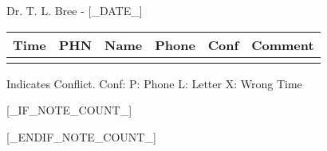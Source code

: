 \documentclass[12pt]{article}
\newenvironment{my_enumerate}{
\begin{enumerate}
  \setlength{\itemsep}{1pt}
  \setlength{\parskip}{0pt}
  \setlength{\parsep}{0pt}}{\end{enumerate}
}
\begin{document}
\begin{center}
{\Large Dr. T. L. Bree - [_DATE_]} \\[.5pc]
\end{center}


\footnotesize
\vspace{0.12in}

\begin{center}
\begin{tabular}{rllrll}
\textbf{Time} & \textbf{PHN} & \textbf{Name} & \textbf{Phone} & \textbf{Conf} & \textbf{Comment} \\
\midrule
[_CONTENTS_]
\bottomrule
\vspace{-0.40in}
\end{tabular}
\end{center}

\begin{center}
{\scriptsize * Indicates Conflict.  Conf: P: Phone L: Letter X: Wrong Time}
\end{center}


[_IF_NOTE_COUNT_]
\begin{my_enumerate}
[_NOTES_]
\end{my_enumerate}
[_ENDIF_NOTE_COUNT_]
\end{document}
